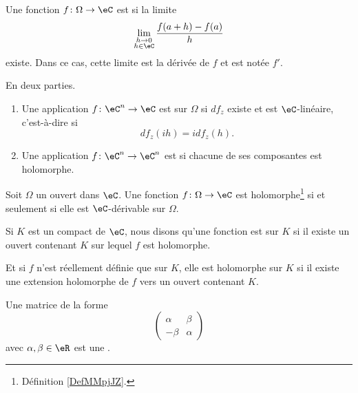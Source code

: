 \begin{definition}      \label{DEFooVJVXooKlnFkh}
	Une fonction \( f\colon \Omega\to \eC\) est  si la limite
	\begin{equation}
		\lim_{\substack{h\to0\\h\in \eC}} \frac{ f(a+h)-f(a) }{ h }
	\end{equation}
	existe. Dans ce cas, cette limite est la dérivée de \( f\) et est notée \( f'\).
\end{definition}

\begin{definition}  \label{DefMMpjJZ}
	En deux parties.
	\begin{enumerate}
		\item
		      Une application \(f \colon \eC^n\to \eC  \) est  sur \( \Omega\) si \( df_z\) existe et est \( \eC\)-linéaire, c'est-à-dire si
		      \begin{equation}
			      df_z(ih)=idf_z(h).
		      \end{equation}
		\item
		      Une application \(f \colon \eC^n\to \eC^n  \) est  si chacune de ses composantes est holomorphe.
	\end{enumerate}
\end{definition}


\begin{proposition}	\label{PROPooBXIWooUvIJMW}
	Soit \( \Omega\) un ouvert dans \( \eC\). Une fonction \( f\colon \Omega\to \eC\) est holomorphe\footnote{Définition \ref{DefMMpjJZ}.} si et seulement si elle est \( \eC\)-dérivable sur \( \Omega\).
\end{proposition}



\begin{definition}      \label{DEFooQSMCooOoWVZk}
	Si \( K\) est un compact de \( \eC\), nous disons qu'une fonction est  sur \( K\) si il existe un ouvert contenant \( K\) sur lequel \( f\) est holomorphe.

	Et si \( f\) n'est réellement définie que sur \( K\), elle est holomorphe sur \( K\) si il existe une extension holomorphe de \( f\) vers un ouvert contenant \( K\).
\end{definition}

\begin{definition}[Similitude] \label{DEFooSRKYooLkGVUe}
	Une matrice de la forme
	\begin{equation}
		\begin{pmatrix}
			\alpha & \beta  \\
			-\beta & \alpha
		\end{pmatrix}
	\end{equation}
	avec \( \alpha,\beta\in \eR\) est une .
\end{definition}

